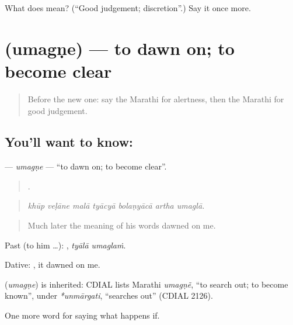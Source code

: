 \begin{tcolorbox}[breakable,colback=teal!4,colframe=teal!35!black,title={Before you move on}]
What does  mean? (\textquotedblleft{}Good judgement; discretion\textquotedblright{}.) Say it once more.
\end{tcolorbox}
\section[\texorpdfstring{\mr{उमगणे} (umagṇe)}{उमगणे (umagṇe)}]{ (umagṇe) — to dawn on; to become clear}

\label{lesson:MR-C394-umagne}



\begin{quote}
Before the new one: say the Marathi for alertness, then the Marathi for good judgement.
\end{quote}

\subsection*{You'll want to know: }
\textbf{} — \emph{umagṇe} — \textquotedblleft{}to dawn on; to become clear\textquotedblright{}.

\begin{quote}
      .
\end{quote}

\begin{quote}
\emph{khūp veḷāne malā tyācyā bolaṇyācā artha umaglā.}
\end{quote}

\begin{quote}
Much later the meaning of his words dawned on me.
\end{quote}

Past (to him …):  , \emph{tyālā umaglaṁ}.

Dative:  , it dawned on me.

\begin{cousinweb}
\textbf{} (\emph{umagṇe}) is inherited: CDIAL lists Marathi \emph{umagṇẽ}, \textquotedblleft{}to search out; to become known\textquotedblright{}, under \emph{*unmārgati}, \textquotedblleft{}searches out\textquotedblright{} (CDIAL 2126).
\end{cousinweb}

\begin{grammarlens}[title={What you've built}]
One more word for saying what happens if.
\end{grammarlens}

